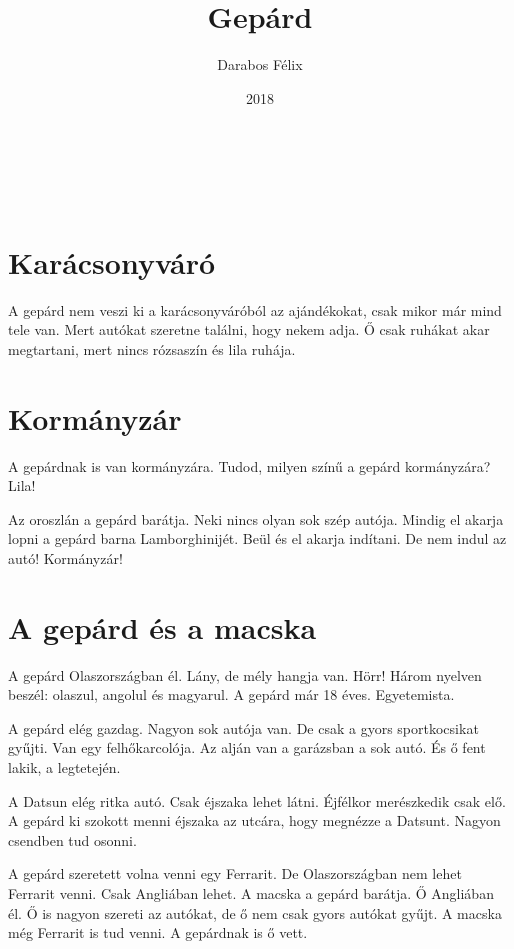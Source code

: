 \documentclass[12pt]{memoir}
\author{Darabos Félix}
\date{2018}
\title{Gepárd}
\begin{document}
\begin{titlingpage}
  \centering
  \vspace*{0.2\textheight}
  {\Huge\bfseries\playfair \thetitle}\\[\baselineskip]
  {\large\theauthor}\\[\baselineskip]
  \vfill
  {\thedate}
  \vspace*{0.1\textheight}
\end{titlingpage}


\section*{Karácsonyváró}
A gepárd nem veszi ki a karácsonyváróból az ajándékokat, csak mikor már mind
tele van. Mert autókat szeretne találni, hogy nekem adja. Ő csak ruhákat akar
megtartani, mert nincs rózsaszín és lila ruhája.


\section*{Kormányzár}
A gepárdnak is van kormányzára. Tudod, milyen színű a gepárd kormányzára? Lila!

Az oroszlán a gepárd barátja. Neki nincs olyan sok szép autója. Mindig el
akarja lopni a gepárd barna Lamborghinijét. Beül és el akarja indítani. De nem
indul az autó! Kormányzár!


\section*{A gepárd és a macska}
A gepárd Olaszországban él. Lány, de mély hangja van. Hörr! Három nyelven
beszél: olaszul, angolul és magyarul. A gepárd már 18 éves. Egyetemista.

A gepárd elég gazdag. Nagyon sok autója van. De csak a gyors sportkocsikat
gyűjti. Van egy felhőkarcolója. Az alján van a garázsban a sok autó. És ő fent
lakik, a legtetején.

A Datsun elég ritka autó. Csak éjszaka lehet látni. Éjfélkor merészkedik csak
elő. A gepárd ki szokott menni éjszaka az utcára, hogy megnézze a Datsunt.
Nagyon csendben tud osonni.

A gepárd szeretett volna venni egy Ferrarit. De Olaszországban nem lehet
Ferrarit venni. Csak Angliában lehet. A macska a gepárd barátja. Ő Angliában
él. Ő is nagyon szereti az autókat, de ő nem csak gyors autókat gyűjt. A macska
még Ferrarit is tud venni. A gepárdnak is ő vett.
\end{document}
